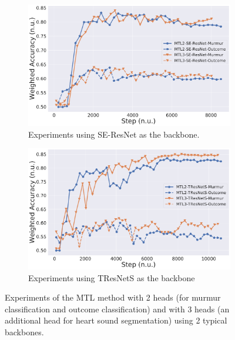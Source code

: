 
\begin{figure}
\centering
\begin{subfigure}[b]{0.49\linewidth}
    \centering
    \includegraphics[width=\textwidth]{images/se-resnet-clf-vs-mtl.pdf}
    \caption[]
    {Experiments using SE-ResNet as the backbone.}
    \label{fig:se-resnet-clf-vs-mtl}
\end{subfigure}
\hfill
\begin{subfigure}[b]{0.49\linewidth}
    \centering
    \includegraphics[width=\textwidth]{images/tresnets-clf-vs-mtl.pdf}
    \caption[]
    {Experiments using TResNetS as the backbone}
    \label{fig:tresnets-clf-vs-mtl}
\end{subfigure}
\caption[]
{Experiments of the MTL method with 2 heads (for murmur classification and outcome classification) and with 3 heads (an additional head for heart sound segmentation) using 2 typical backbones.}
\label{fig:mtl_comparison}
\end{figure}
